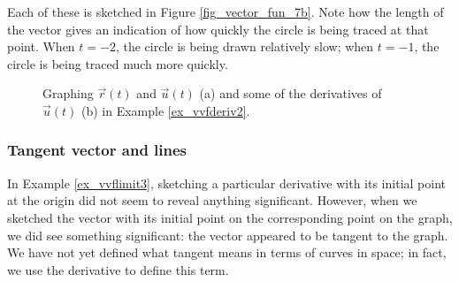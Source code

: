 \begin{example}
\begin{enumerate}
Each of these is sketched in Figure \ref{fig_vector_fun_7b}. Note how the length of the vector gives an indication of how quickly the circle is being traced at that point. When $t=-2$, the circle is being drawn relatively slow; when $t=-1$, the circle is being traced much more quickly.
\end{enumerate}

\begin{figure}[H]
\centering
\centerline{
\hspace{0.1cm}
}
\caption{Graphing $\vec r(t)$ and $\vec u(t)$ (a) and some of the derivatives of $\vec u(t)$ (b) in Example \ref{ex_vvfderiv2}.}
\end{figure}

\end{example}


\subsubsection{Tangent vector and lines}
In Example \ref{ex_vvflimit3}, sketching a particular derivative with its initial point at the origin did not seem to reveal anything significant. However, when we sketched the vector with its initial point on the corresponding point on the graph, we did see something significant: the vector appeared to be tangent to the graph. We have not yet defined what tangent means in terms of curves in space; in fact, we use the derivative to define this term.


